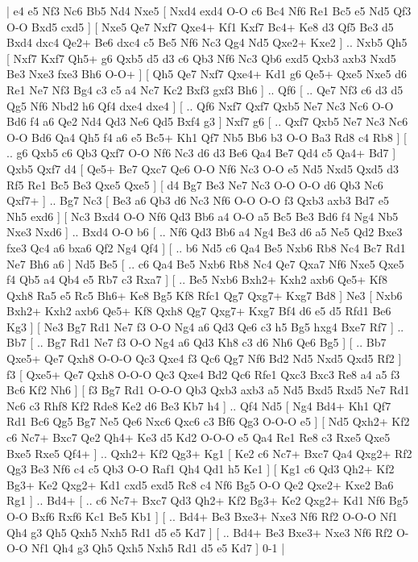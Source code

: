 \makegametitle 
|   e4   e5    Nf3   Nc6    Bb5   Nd4    Nxe5 [  Nxd4 exd4  O-O c6  Bc4 Nf6  Re1 Bc5  e5 Nd5  Qf3 O-O  Bxd5 cxd5   ]  [  Nxe5 Qe7  Nxf7 Qxe4+  Kf1 Kxf7  Bc4+ Ke8  d3 Qf5  Be3 d5  Bxd4 dxc4  Qe2+ Be6  dxc4 c5  Be5 Nf6  Nc3 Qg4  Nd5 Qxe2+  Kxe2   ] .. Nxb5    Qh5 [  Nxf7 Kxf7  Qh5+ g6  Qxb5 d5  d3 c6  Qb3 Nf6  Nc3 Qb6  exd5 Qxb3  axb3 Nxd5  Be3 Nxe3  fxe3 Bh6  O-O+   ]  [  Qh5 Qe7  Nxf7 Qxe4+  Kd1 g6  Qe5+ Qxe5  Nxe5 d6  Re1 Ne7  Nf3 Bg4  c3 c5  a4 Nc7  Kc2 Bxf3  gxf3 Bh6   ] .. Qf6 [ .. Qe7  Nf3 c6  d3 d5  Qg5 Nf6  Nbd2 h6  Qf4 dxe4  dxe4   ]  [ .. Qf6  Nxf7 Qxf7  Qxb5 Ne7  Nc3 Nc6  O-O Bd6  f4 a6  Qe2 Nd4  Qd3 Ne6  Qd5 Bxf4  g3   ]  Nxf7   g6 [ .. Qxf7  Qxb5 Ne7  Nc3 Nc6  O-O Bd6  Qa4 Qh5  f4 a6  e5 Bc5+  Kh1 Qf7  Nb5 Bb6  b3 O-O  Ba3 Rd8  c4 Rb8   ]  [ .. g6  Qxb5 c6  Qb3 Qxf7  O-O Nf6  Nc3 d6  d3 Be6  Qa4 Be7  Qd4 c5  Qa4+ Bd7   ]  Qxb5   Qxf7    d4 [  Qe5+ Be7  Qxc7 Qe6  O-O Nf6  Nc3 O-O  e5 Nd5  Nxd5 Qxd5  d3 Rf5  Re1 Bc5  Be3 Qxe5  Qxe5   ]  [  d4 Bg7  Be3 Ne7  Nc3 O-O  O-O d6  Qb3 Nc6  Qxf7+   ] .. Bg7    Nc3 [  Be3 a6  Qb3 d6  Nc3 Nf6  O-O O-O  f3 Qxb3  axb3 Bd7  e5 Nh5  exd6   ]  [  Nc3 Bxd4  O-O Nf6  Qd3 Bb6  a4 O-O  a5 Bc5  Be3 Bd6  f4 Ng4  Nb5 Nxe3  Nxd6   ] .. Bxd4    O-O   b6 [ .. Nf6  Qd3 Bb6  a4 Ng4  Be3 d6  a5 Ne5  Qd2 Bxe3  fxe3 Qc4  a6 bxa6  Qf2 Ng4  Qf4   ]  [ .. b6  Nd5 c6  Qa4 Be5  Nxb6 Rb8  Nc4 Bc7  Rd1 Ne7  Bh6 a6   ]  Nd5   Be5 [ .. c6  Qa4 Be5  Nxb6 Rb8  Nc4 Qe7  Qxa7 Nf6  Nxe5 Qxe5  f4 Qb5  a4 Qb4  e5 Rb7  c3 Rxa7   ]  [ .. Be5  Nxb6 Bxh2+  Kxh2 axb6  Qe5+ Kf8  Qxh8 Ra5  e5 Rc5  Bh6+ Ke8  Bg5 Kf8  Rfc1 Qg7  Qxg7+ Kxg7  Bd8   ]  Ne3 [  Nxb6 Bxh2+  Kxh2 axb6  Qe5+ Kf8  Qxh8 Qg7  Qxg7+ Kxg7  Bf4 d6  e5 d5  Rfd1 Be6  Kg3   ]  [  Ne3 Bg7  Rd1 Ne7  f3 O-O  Ng4 a6  Qd3 Qe6  c3 h5  Bg5 hxg4  Bxe7 Rf7   ] .. Bb7 [ .. Bg7  Rd1 Ne7  f3 O-O  Ng4 a6  Qd3 Kh8  c3 d6  Nh6 Qe6  Bg5   ]  [ .. Bb7  Qxe5+ Qe7  Qxh8 O-O-O  Qc3 Qxe4  f3 Qc6  Qg7 Nf6  Bd2 Nd5  Nxd5 Qxd5  Rf2   ]  f3 [  Qxe5+ Qe7  Qxh8 O-O-O  Qc3 Qxe4  Bd2 Qc6  Rfe1 Qxc3  Bxc3 Re8  a4 a5  f3 Bc6  Kf2 Nh6   ]  [  f3 Bg7  Rd1 O-O-O  Qb3 Qxb3  axb3 a5  Nd5 Bxd5  Rxd5 Ne7  Rd1 Nc6  c3 Rhf8  Kf2 Rde8  Ke2 d6  Be3 Kb7  h4   ] .. Qf4    Nd5 [  Ng4 Bd4+  Kh1 Qf7  Rd1 Bc6  Qg5 Bg7  Ne5 Qe6  Nxc6 Qxc6  c3 Bf6  Qg3 O-O-O  e5   ]  [  Nd5 Qxh2+  Kf2 c6  Nc7+ Bxc7  Qe2 Qh4+  Ke3 d5  Kd2 O-O-O  e5 Qa4  Re1 Re8  c3 Rxe5  Qxe5 Bxe5  Rxe5 Qf4+   ] .. Qxh2+    Kf2  Qg3+    Kg1 [  Ke2 c6  Nc7+ Bxc7  Qa4 Qxg2+  Rf2 Qg3  Be3 Nf6  c4 c5  Qb3 O-O  Raf1 Qh4  Qd1 h5  Ke1   ]  [  Kg1 c6  Qd3 Qh2+  Kf2 Bg3+  Ke2 Qxg2+  Kd1 cxd5  exd5 Rc8  c4 Nf6  Bg5 O-O  Qe2 Qxe2+  Kxe2 Ba6  Rg1   ] .. Bd4+ [ .. c6  Nc7+ Bxc7  Qd3 Qh2+  Kf2 Bg3+  Ke2 Qxg2+  Kd1 Nf6  Bg5 O-O  Bxf6 Rxf6  Kc1 Be5  Kb1   ]  [ .. Bd4+  Be3 Bxe3+  Nxe3 Nf6  Rf2 O-O-O  Nf1 Qh4  g3 Qh5  Qxh5 Nxh5  Rd1 d5  e5 Kd7   ]  [ .. Bd4+  Be3 Bxe3+  Nxe3 Nf6  Rf2 O-O-O  Nf1 Qh4  g3 Qh5  Qxh5 Nxh5  Rd1 d5  e5 Kd7   ] 0-1  |

